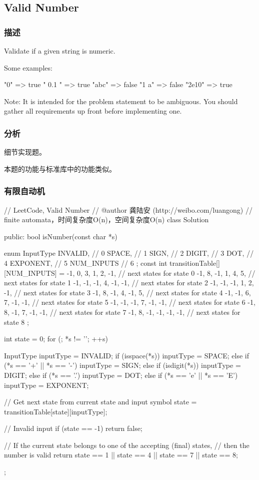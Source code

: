 \subsection{Valid Number} %
\label{sec:valid-number}


\subsubsection{描述}
Validate if a given string is numeric.

Some examples:
\begin{Code}
	"0" => true
	" 0.1 " => true
	"abc" => false
	"1 a" => false
	"2e10" => true
\end{Code}

Note: It is intended for the problem statement to be ambiguous. You should gather all requirements up front before implementing one.


\subsubsection{分析}
细节实现题。

本题的功能与标准库中的功能类似。


\subsubsection{有限自动机}
\begin{Code}
	// LeetCode, Valid Number
	// @author 龚陆安 (http://weibo.com/luangong)
	// finite automata，时间复杂度O(n)，空间复杂度O(n)
	class Solution {
		public:
		bool isNumber(const char *s) {
			enum InputType {
				INVALID,    // 0
				SPACE,      // 1
				SIGN,       // 2
				DIGIT,      // 3
				DOT,        // 4
				EXPONENT,   // 5
				NUM_INPUTS  // 6
			};
			const int transitionTable[][NUM_INPUTS] = {
				-1, 0, 3, 1, 2, -1, // next states for state 0
				-1, 8, -1, 1, 4, 5,     // next states for state 1
				-1, -1, -1, 4, -1, -1,     // next states for state 2
				-1, -1, -1, 1, 2, -1,     // next states for state 3
				-1, 8, -1, 4, -1, 5,     // next states for state 4
				-1, -1, 6, 7, -1, -1,     // next states for state 5
				-1, -1, -1, 7, -1, -1,     // next states for state 6
				-1, 8, -1, 7, -1, -1,     // next states for state 7
				-1, 8, -1, -1, -1, -1,     // next states for state 8
			};
			
			int state = 0;
			for (; *s != '\0'; ++s) {
				InputType inputType = INVALID;
				if (isspace(*s))
				inputType = SPACE;
				else if (*s == '+' || *s == '-')
				inputType = SIGN;
				else if (isdigit(*s))
				inputType = DIGIT;
				else if (*s == '.')
				inputType = DOT;
				else if (*s == 'e' || *s == 'E')
				inputType = EXPONENT;
				
				// Get next state from current state and input symbol
				state = transitionTable[state][inputType];
				
				// Invalid input
				if (state == -1) return false;
			}
			// If the current state belongs to one of the accepting (final) states,
			// then the number is valid
			return state == 1 || state == 4 || state == 7 || state == 8;
			
		}
	};
\end{Code}


